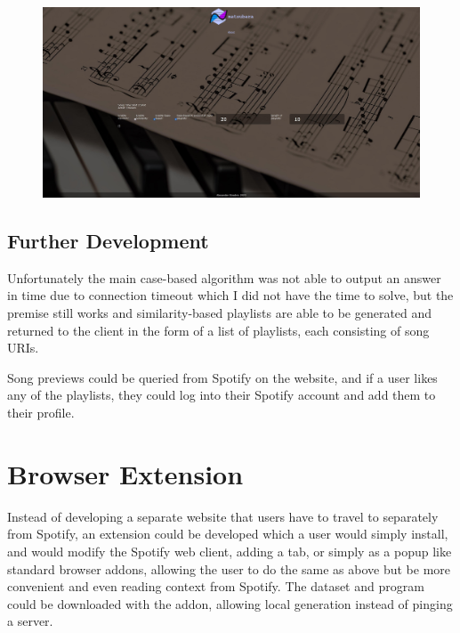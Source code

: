 \documentclass[a4paper, 12pt]{report}
\begin{document}
\begin{figure}[H]
    \centering
    \includegraphics[width=\textwidth]{webapp2.jpeg}
\end{figure}

\subsection*{Further Development}
Unfortunately the main case-based algorithm was not able to output an answer in time due to connection timeout which I did not have the time to solve,
but the premise still works and similarity-based playlists are able to be generated and returned to the client in the form of a list of playlists, each consisting of song URIs.

Song previews could be queried from Spotify on the website, and if a user likes any of the playlists, they could log into their Spotify account
and add them to their profile.

\section{Browser Extension}
Instead of developing a separate website that users have to travel to separately from Spotify, an extension could be developed which a user would simply install,
and would modify the Spotify web client, adding a tab, or simply as a popup like standard browser addons, allowing the user to do the same as above but be
more convenient and even reading context from Spotify. The dataset and program could be downloaded with the addon, allowing local generation instead of pinging a server.

\printbibliography{}
\end{document}
